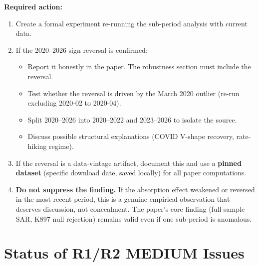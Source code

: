 \documentclass[12pt,a4paper]{article}
\begin{document}
\textbf{Required action:}
\begin{enumerate}[nosep]
\item Create a formal experiment re-running the sub-period analysis with current data.
\item If the 2020--2026 sign reversal is confirmed:
\begin{itemize}[nosep]
\item Report it honestly in the paper. The robustness section must include the reversal.
\item Test whether the reversal is driven by the March 2020 outlier (re-run excluding 2020-02 to 2020-04).
\item Split 2020--2026 into 2020--2022 and 2023--2026 to isolate the source.
\item Discuss possible structural explanations (COVID V-shape recovery, rate-hiking regime).
\end{itemize}
\item If the reversal is a data-vintage artifact, document this and use a \textbf{pinned dataset} (specific download date, saved locally) for all paper computations.
\item \textbf{Do not suppress the finding.} If the absorption effect weakened or reversed in the most recent period, this is a genuine empirical observation that deserves discussion, not concealment. The paper's core finding (full-sample SAR, K897 null rejection) remains valid even if one sub-period is anomalous.
\end{enumerate}


\bigskip

\section*{Status of R1/R2 MEDIUM Issues}
\end{document}
